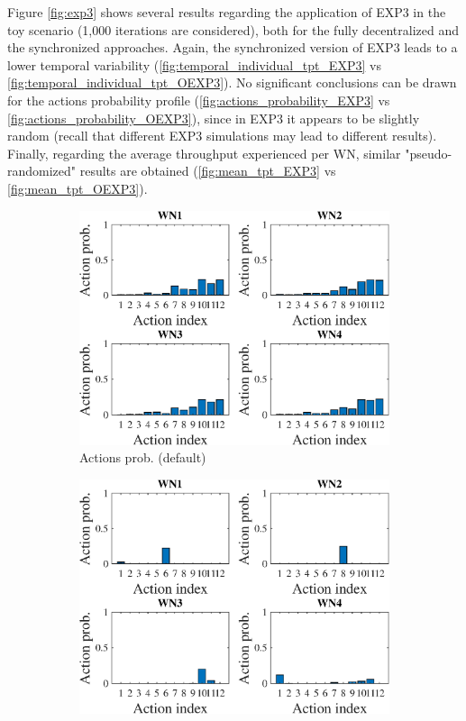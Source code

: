 \documentclass[preprint,12pt]{article}
\begin{document}
Figure \ref{fig:exp3} shows several results regarding the application of EXP3 in the toy scenario (1,000 iterations are considered), both for the fully decentralized and the synchronized approaches. Again, the synchronized version of EXP3 leads to a lower temporal variability (\ref{fig:temporal_individual_tpt_EXP3} vs \ref{fig:temporal_individual_tpt_OEXP3}). No significant conclusions can be drawn for the actions probability profile (\ref{fig:actions_probability_EXP3} vs \ref{fig:actions_probability_OEXP3}), since in EXP3 it appears to be slightly random (recall that different EXP3 simulations may lead to different results). Finally, regarding the average throughput experienced per WN, similar "pseudo-randomized" results are obtained (\ref{fig:mean_tpt_EXP3} vs \ref{fig:mean_tpt_OEXP3}). 

\begin{figure}[h!]
	\centering
	\begin{subfigure}[b]{.3\textwidth}
		\includegraphics[width=\textwidth]{images/actions_probability_EXP3}
		\caption{Actions prob. (default)}\label{fig:hist_actions_EXP3}
	\end{subfigure}
	\begin{subfigure}[b]{.3\textwidth}
		\includegraphics[width=\textwidth]{images/actions_probability_CEXP3}

\end{subfigure}
\end{figure}
\end{document}
